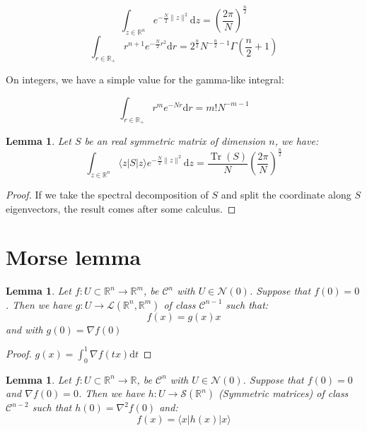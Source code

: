 \documentclass[10pt,a4paper]{report}
\theoremstyle{plain}
\newtheorem{lem}[thm]{Lemma}
\theoremstyle{definition}
\theoremstyle{remark}
\newcommand{\R}{\ensuremath{\mathbb{R}}}
\newcommand{\ket}[1]{|#1\rangle}
\newcommand{\bra}[1]{\langle#1|}
\newcommand{\dd}{\mathrm{d}}
\DeclareMathOperator{\Tr}{Tr}
\newcommand{\class}[1]{{\mathscr{C}^{#1}}}
\begin{document}
\begin{equation}\label{eqn:gaussdimn}
  \int_{z \in\R^n} e^{-\frac N2 \|z\|^2} \dd z = {\left(\frac
      {2\pi}{N}\right)}^{\frac n 2}
\end{equation}
\begin{equation}\label{eqn:gausspown}
  \int_{r \in\R_+} r^{n+1} e^{-\frac N2 r^2} \dd r = 2^{\frac n2}N^{-\frac n2
    -1}\Gamma\left(\frac n 2 + 1\right)
\end{equation}

On integers, we have a simple value for the gamma-like integral:

\begin{equation}\label{eqn:gamma}
  \int_{r \in\R_+} r^{m} e^{- N r} \dd r = m! N^{-m-1}
\end{equation}



\begin{lem}\label{lem:gausssymtr}
  Let $S$ be an real symmetric matrix of dimension $n$, we have:
  \[\int_{z \in \R^n} \bra z S \ket z e^{-\frac N 2 \|z\|^2} \dd z =
    \frac{\Tr(S)}N {\left(\frac
        {2\pi}{N}\right)}^{\frac n 2} \]
\end{lem}
\begin{proof} If we take the spectral decomposition of $S$ and split the
  coordinate along $S$ eigenvectors, the result comes after some calculus.
\end{proof}

\section{Morse lemma}

\begin{lem}\label{lem:dec}
  Let $f : U \subset \R^n \to \R^m$, be $\class{n}$ with $U \in \mathcal{N}(0)$.
  Suppose that $f(0) = 0$. Then we have $g : U \to \mathcal{L}(\R^n,\R^m)$ of
  class $\class {n-1}$ such
  that:
  \[f(x) = g(x) x\]
  and with $g(0) = \nabla f(0)$
\end{lem}

\begin{proof}
  $g(x) = \int_0^1 \nabla f(tx) \dd t$
\end{proof}

\begin{lem}\label{lem:dec2}
  Let $f : U \subset \R^n \to \R$, be $\class{n}$ with $U \in \mathcal{N}(0)$.
  Suppose that $f(0) = 0$ and $\nabla f(0) = 0$.
  Then we have $h : U \to \mathcal{S}(\R^n)$ (Symmetric matrices) of class
  $\class {n-2}$ such
  that $h(0) = \nabla^2 f(0)$ and:
  \[f(x) = \bra x h(x) \ket x\]
\end{lem}
\end{document}
